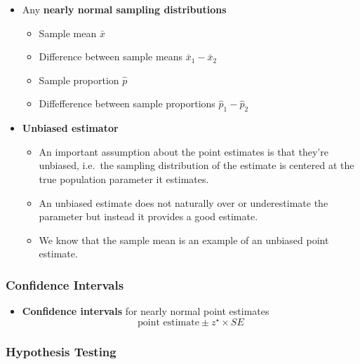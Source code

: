 \documentclass[]{book}
\providecommand{\tightlist}{%
  \setlength{\itemsep}{0pt}\setlength{\parskip}{0pt}}
\begin{document}
\begin{itemize}
\tightlist
\item
  Any \textbf{nearly normal sampling distributions}

  \begin{itemize}
  \tightlist
  \item
    Sample mean \(\bar{x}\)
  \item
    Difference between sample means \(\bar{x}_1 - \bar{x}_2\)
  \item
    Sample proportion \(\hat{p}\)
  \item
    Diffefference between sample proportions \(\hat{p}_1 - \hat{p}_2\)
  \end{itemize}
\item
  \textbf{Unbiased estimator}

  \begin{itemize}
  \tightlist
  \item
    An important assumption about the point estimates is that they're unbiased, i.e.~the sampling distribution of the estimate is centered at the true population parameter it estimates.
  \item
    An unbiased estimate does not naturally over or underestimate the parameter but instead it provides a good estimate.
  \item
    We know that the sample mean is an example of an unbiased point estimate.
  \end{itemize}
\end{itemize}

\hypertarget{confidence-intervals}{%
\subsubsection*{Confidence Intervals}\label{confidence-intervals}}

\begin{itemize}
\tightlist
\item
  \textbf{Confidence intervals} for nearly normal point estimates
  \[ \text{point estimate} \pm z^{\star} \times SE \]
\end{itemize}

\hypertarget{hypothesis-testing-1}{%
\subsubsection*{Hypothesis Testing}\label{hypothesis-testing-1}}
\end{document}
